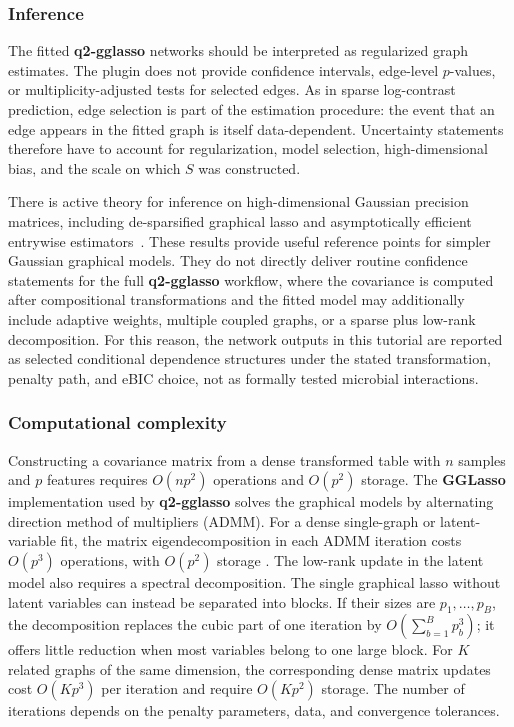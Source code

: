 \documentclass[11pt,a4paper]{article}
\newcommand{\pkg}[1]{\textbf{#1}}
\begin{document}
\subsubsection{Inference}
\label{sec:gglasso-inference}

The fitted \pkg{q2-gglasso} networks should be interpreted as regularized graph
estimates. The plugin does not provide confidence intervals, edge-level
$p$-values, or multiplicity-adjusted tests for selected edges. As in sparse
log-contrast prediction, edge selection is part of the estimation procedure: the
event that an edge appears in the fitted graph is itself data-dependent.
Uncertainty statements therefore have to account for regularization, model
selection, high-dimensional bias, and the scale on which $S$ was constructed.

There is active theory for inference on high-dimensional Gaussian precision
matrices, including de-sparsified graphical lasso and asymptotically efficient
entrywise estimators~\citep{jankova2015confidence,ren2015asymptotic}. These
results provide useful reference points for simpler Gaussian graphical models.
They do not directly deliver routine confidence statements for the full
\pkg{q2-gglasso} workflow, where the covariance is computed after compositional
transformations and the fitted model may additionally include adaptive weights,
multiple coupled graphs, or a sparse plus low-rank decomposition. For this
reason, the network outputs in this tutorial are reported as selected conditional
dependence structures under the stated transformation, penalty path, and eBIC
choice, not as formally tested microbial interactions.

\subsubsection{Computational complexity}
\label{sec:gglasso-complexity}

Constructing a covariance matrix from a dense transformed table with $n$
samples and $p$ features requires $O(np^2)$ operations and $O(p^2)$ storage.
The \pkg{GGLasso} implementation used by \pkg{q2-gglasso} solves the graphical
models by alternating direction method of multipliers (ADMM). For a dense
single-graph or latent-variable fit, the matrix eigendecomposition in each
ADMM iteration costs $O(p^3)$ operations, with $O(p^2)$ storage
\citep{Schaipp2021}. The low-rank update in the latent model also requires a
spectral decomposition. The single graphical lasso without latent variables
can instead be separated into blocks. If their sizes are $p_1,\ldots,p_B$,
the decomposition replaces the cubic part of one iteration by
$O(\sum_{b=1}^{B}p_b^3)$; it offers little reduction when most variables
belong to one large block. For $K$ related graphs of the same dimension,
the corresponding dense matrix updates cost $O(Kp^3)$ per iteration and
require $O(Kp^2)$ storage. The number of iterations depends on the penalty
parameters, data, and convergence tolerances.
\end{document}

